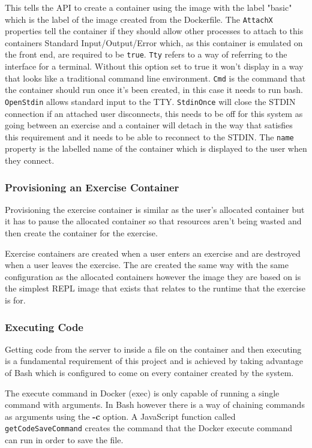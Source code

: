 This tells the API to create a container using the image with the label "basic" which is the label of the image created from the Dockerfile. The \texttt{AttachX} properties tell the container if they should allow other processes to attach to this containers Standard Input/Output/Error which, as this container is emulated on the front end, are required to be \texttt{true}. \texttt{Tty} refers to a way of referring to the interface for a terminal. Without this option set to true it won't display in a way that looks like a traditional command line environment. \texttt{Cmd} is the command that the container should run once it's been created, in this case it needs to run bash. \texttt{OpenStdin} allows standard input to the TTY. \texttt{StdinOnce} will close the STDIN connection if an attached user disconnects, this needs to be off for this system as going between an exercise and a container will detach in the way that satisfies this requirement and it needs to be able to reconnect to the STDIN. The \texttt{name} property is the labelled name of the container which is displayed to the user when they connect.

\subsubsection{Provisioning an Exercise Container} \label{impl-exer-cont}

Provisioning the exercise container is similar as the user's allocated container but it has to pause the allocated container so that resources aren't being wasted and then create the container for the exercise.

Exercise containers are created when a user enters an exercise and are destroyed when a user leaves the exercise. The are created the same way with the same configuration as the allocated containers however the image they are based on is the simplest REPL image that exists that relates to the runtime that the exercise is for.

\subsubsection{Executing Code} \label{imp-execode}

Getting code from the server to inside a file on the container and then executing is a fundamental requirement of this project and is achieved by taking advantage of Bash which is configured to come on every container created by the system.

The execute command in Docker (exec) is only capable of running a single command with arguments. In Bash however there is a way of chaining commands as arguments using the \textbf{-c} option. A JavaScript function called \texttt{getCodeSaveCommand} creates the command that the Docker execute command can run in order to save the file.

